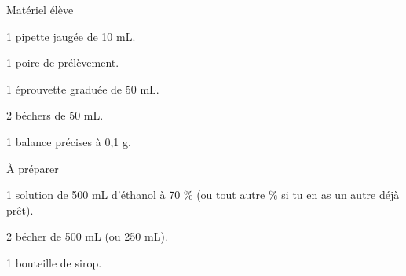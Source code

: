 
\begin{boiteMateriel}{Matériel élève}
  \effectifSeconde
  
  \begin{protocole}[2]
    \item 1 pipette jaugée de 10 mL.
    \item 1 poire de prélèvement.
    \item 1 éprouvette graduée de 50 mL.
    \item 2 béchers de 50 mL.
    \item 1 balance précises à 0,1 g.
    \item[\vspace{\fill}]
  \end{protocole}
\end{boiteMateriel}


\begin{boiteMateriel}{À préparer}
  \begin{protocole}
    \item 1 solution de 500 mL d'éthanol à 70 $\%$ (ou tout autre $\%$ si tu en as un autre déjà prêt).
    \item 2 bécher de 500 mL (ou 250 mL).
    \item 1 bouteille de sirop.
  \end{protocole}
\end{boiteMateriel}